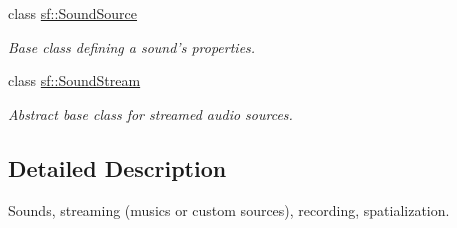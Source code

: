 \begin{DoxyCompactItemize}
class \hyperlink{classsf_1_1SoundSource}{sf\-::\-Sound\-Source}
\begin{DoxyCompactList}\small\item\em Base class defining a sound's properties. \end{DoxyCompactList}\item 
class \hyperlink{classsf_1_1SoundStream}{sf\-::\-Sound\-Stream}
\begin{DoxyCompactList}\small\item\em Abstract base class for streamed audio sources. \end{DoxyCompactList}\end{DoxyCompactItemize}


\subsection{Detailed Description}
Sounds, streaming (musics or custom sources), recording, spatialization. 